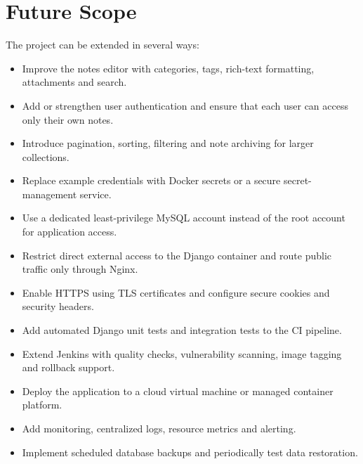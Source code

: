 \documentclass[12pt,a4paper,oneside]{report}
\begin{document}
\chapter*{Future Scope}
The project can be extended in several ways:
\begin{itemize}[leftmargin=0.4in]
\item Improve the notes editor with categories, tags, rich-text formatting, attachments and search.
\item Add or strengthen user authentication and ensure that each user can access only their own notes.
\item Introduce pagination, sorting, filtering and note archiving for larger collections.
\item Replace example credentials with Docker secrets or a secure secret-management service.
\item Use a dedicated least-privilege MySQL account instead of the root account for application access.
\item Restrict direct external access to the Django container and route public traffic only through Nginx.
\item Enable HTTPS using TLS certificates and configure secure cookies and security headers.
\item Add automated Django unit tests and integration tests to the CI pipeline.
\item Extend Jenkins with quality checks, vulnerability scanning, image tagging and rollback support.
\item Deploy the application to a cloud virtual machine or managed container platform.
\item Add monitoring, centralized logs, resource metrics and alerting.
\item Implement scheduled database backups and periodically test data restoration.
\end{itemize}
\end{document}

